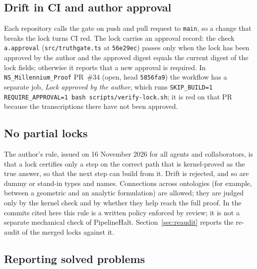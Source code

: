 \documentclass[11pt,a4paper]{article}
\newcommand{\code}[1]{\texttt{#1}}
\begin{document}
\subsection{Drift in CI and author approval}

Each repository calls the gate on push and pull request to \code{main}, so a change that breaks
the lock turns CI red. The lock carries an approval record: the check \code{a.approval}
(\code{src/truthgate.ts} at \code{56e29ec}) passes only when the lock has been approved by the
author and the approved digest equals the current digest of the lock fields; otherwise it
reports that a new approval is required. In \code{NS\_Millennium\_Proof} PR~\#34 (open, head
\code{5856fa9}) the workflow has a separate job, \emph{Lock approved by the author}, which runs
\code{SKIP\_BUILD=1 REQUIRE\_APPROVAL=1 bash scripts/verify-lock.sh}; it is red on that PR
because the transcriptions there have not been approved.

\subsection{No partial locks}

The author's rule, issued on 16 November 2026 for all agents and collaborators, is that a lock
certifies only a step on the correct path that is kernel-proved as the true answer, so that the
next step can build from it. Drift is rejected, and so are dummy or stand-in types and names.
Connections across ontologies (for example, between a geometric and an analytic formulation)
are allowed; they are judged only by the kernel check and by whether they help reach the full
proof. In the commits cited here this rule is a written policy enforced by review; it is not a
separate mechanical check of PipelineHalt. Section~\ref{sec:reaudit} reports the re-audit of the
merged locks against it.

\subsection{Reporting solved problems}
\label{sec:solved}
\end{document}
